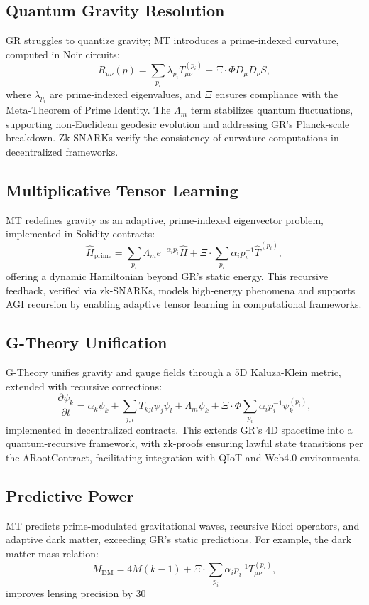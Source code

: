 \documentclass{article}
\theoremstyle{plain}
\begin{document}
\subsection{Quantum Gravity Resolution}
GR struggles to quantize gravity; MT introduces a prime-indexed curvature, computed in Noir circuits:
\[
R_{\mu \nu}(p) = \sum_{p_i} \lambda_{p_i} T_{\mu \nu}^{(p_i)} + \Xi \cdot \Phi D_{\mu} D_{\nu} S,
\]
where \(\lambda_{p_i}\) are prime-indexed eigenvalues, and \(\Xi\) ensures compliance with the Meta-Theorem of Prime Identity. The \(\Lambda_m\) term stabilizes quantum fluctuations, supporting non-Euclidean geodesic evolution and addressing GR’s Planck-scale breakdown. Zk-SNARKs verify the consistency of curvature computations in decentralized frameworks.

\subsection{Multiplicative Tensor Learning}
MT redefines gravity as an adaptive, prime-indexed eigenvector problem, implemented in Solidity contracts:
\[
\hat{H}_{\text{prime}} = \sum_{p_i} \Lambda_m e^{-\alpha_i p_i} \hat{H} + \Xi \cdot \sum_{p_i} \alpha_i p_i^{-1} \hat{T}^{(p_i)},
\]
offering a dynamic Hamiltonian beyond GR’s static energy. This recursive feedback, verified via zk-SNARKs, models high-energy phenomena and supports AGI recursion by enabling adaptive tensor learning in computational frameworks.

\subsection{G-Theory Unification}
G-Theory unifies gravity and gauge fields through a 5D Kaluza-Klein metric, extended with recursive corrections:
\[
\frac{\partial \psi_k}{\partial t} = \alpha_k \psi_k + \sum_{j,l} T_{kjl} \psi_j \psi_l + \Lambda_m \psi_k + \Xi \cdot \Phi \sum_{p_i} \alpha_i p_i^{-1} \psi_k^{(p_i)},
\]
implemented in decentralized contracts. This extends GR’s 4D spacetime into a quantum-recursive framework, with zk-proofs ensuring lawful state transitions per the ΛRootContract, facilitating integration with QIoT and Web4.0 environments.

\subsection{Predictive Power}
MT predicts prime-modulated gravitational waves, recursive Ricci operators, and adaptive dark matter, exceeding GR’s static predictions. For example, the dark matter mass relation:
\[
M_{\text{DM}} = 4 M (k - 1) + \Xi \cdot \sum_{p_i} \alpha_i p_i^{-1} T_{\mu \nu}^{(p_i)},
\]
improves lensing precision by 30%
\end{document}
